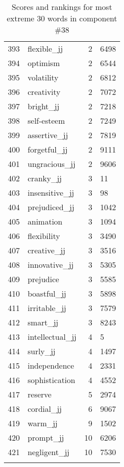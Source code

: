 \begin{longtable}[!htbp]{| rlr@{.}l |}
    393 & flexible\_jj & 2 & 6498 \\
    394 & optimism & 2 & 6544 \\
    395 & volatility & 2 & 6812 \\
    396 & creativity & 2 & 7072 \\
    397 & bright\_jj & 2 & 7218 \\
    398 & self-esteem & 2 & 7249 \\
    399 & assertive\_jj & 2 & 7819 \\
    400 & forgetful\_jj & 2 & 9111 \\
    401 & ungracious\_jj & 2 & 9606 \\
    402 & cranky\_jj & 3 & 11 \\
    403 & insensitive\_jj & 3 & 98 \\
    404 & prejudiced\_jj & 3 & 1042 \\
    405 & animation & 3 & 1094 \\
    406 & flexibility & 3 & 3490 \\
    407 & creative\_jj & 3 & 3516 \\
    408 & innovative\_jj & 3 & 5305 \\
    409 & prejudice & 3 & 5585 \\
    410 & boastful\_jj & 3 & 5898 \\
    411 & irritable\_jj & 3 & 7579 \\
    412 & smart\_jj & 3 & 8243 \\
    413 & intellectual\_jj & 4 & 5 \\
    414 & surly\_jj & 4 & 1497 \\
    415 & independence & 4 & 2331 \\
    416 & sophistication & 4 & 4552 \\
    417 & reserve & 5 & 2974 \\
    418 & cordial\_jj & 6 & 9067 \\
    419 & warm\_jj & 9 & 1502 \\
    420 & prompt\_jj & 10 & 6206 \\
    421 & negligent\_jj & 10 & 7530 \\
    \hline
    \caption{Scores and rankings for most extreme 30 words in component \#38} \\
\end{longtable}
